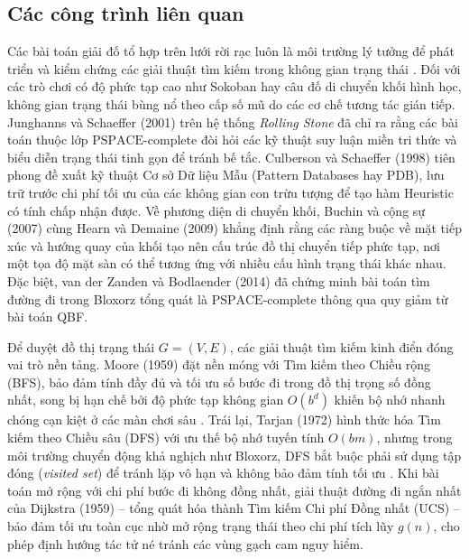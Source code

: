 \subsection{Các công trình liên quan}
\label{subsec:related_work}
\label{subsec:related_search}

Các bài toán giải đố tổ hợp trên lưới rời rạc luôn là môi trường
lý tưởng để phát triển và kiểm chứng các giải thuật tìm kiếm trong
không gian trạng thái \cite{russell2020aima, edelkamp2011heuristic}.
Đối với các trò chơi có độ phức tạp cao như Sokoban hay câu đố di chuyển
khối hình học, không gian trạng thái bùng nổ theo cấp số mũ do các
cơ chế tương tác gián tiếp. Junghanns và Schaeffer (2001)
\cite{junghanns2001sokoban} trên hệ thống \textit{Rolling Stone}
đã chỉ ra rằng các bài toán thuộc lớp $\text{PSPACE-complete}$ đòi
hỏi các kỹ thuật suy luận miền tri thức và biểu diễn trạng thái tinh
gọn để tránh bế tắc. Culberson và Schaeffer (1998) \cite{culberson1998pdb}
tiên phong đề xuất kỹ thuật Cơ sở Dữ liệu Mẫu (Pattern Databases hay PDB),
lưu trữ trước chi phí tối ưu của các không gian con trừu tượng để
tạo hàm Heuristic có tính chấp nhận được. Về phương diện di chuyển khối,
Buchin và cộng sự (2007) \cite{buchin2007rolling} cùng Hearn và
Demaine (2009) \cite{hearn2009games} khẳng định rằng các ràng buộc về
mặt tiếp xúc và hướng quay của khối tạo nên cấu trúc đồ thị chuyển
tiếp phức tạp, nơi một tọa độ mặt sàn có thể tương ứng với nhiều cấu
hình trạng thái khác nhau. Đặc biệt, van der Zanden và Bodlaender (2014)
\cite{vanderzanden2014bloxorz} đã chứng minh bài toán tìm đường đi
trong Bloxorz tổng quát là $\text{PSPACE-complete}$ thông qua quy giảm
từ bài toán QBF.

Để duyệt đồ thị trạng thái $G = (V, E)$, các giải thuật tìm kiếm kinh
điển đóng vai trò nền tảng. Moore (1959) \cite{moore1959bfs} đặt nền
móng với Tìm kiếm theo Chiều rộng (BFS), bảo đảm tính đầy đủ và tối ưu
số bước đi trong đồ thị trọng số đồng nhất, song bị hạn chế bởi độ
phức tạp không gian $O(b^d)$ khiến bộ nhớ nhanh chóng cạn kiệt ở các màn
chơi sâu \cite{russell2020aima}. Trái lại, Tarjan (1972) \cite{tarjan1972dfs}
hình thức hóa Tìm kiếm theo Chiều sâu (DFS) với ưu thế bộ nhớ tuyến tính
$O(bm)$, nhưng trong môi trường chuyển động khả nghịch như Bloxorz, DFS
bắt buộc phải sử dụng tập đóng (\textit{visited set}) để tránh lặp vô hạn
và không bảo đảm tính tối ưu \cite{edelkamp2011heuristic, korf1985ids}.
Khi bài toán mở rộng với chi phí bước đi không đồng nhất, giải thuật
đường đi ngắn nhất của Dijkstra (1959) \cite{dijkstra1959graph} -- tổng
quát hóa thành Tìm kiếm Chi phí Đồng nhất (UCS) -- bảo đảm tối ưu toàn cục
nhờ mở rộng trạng thái theo chi phí tích lũy $g(n)$, cho phép định hướng
tác tử né tránh các vùng gạch cam nguy hiểm.

